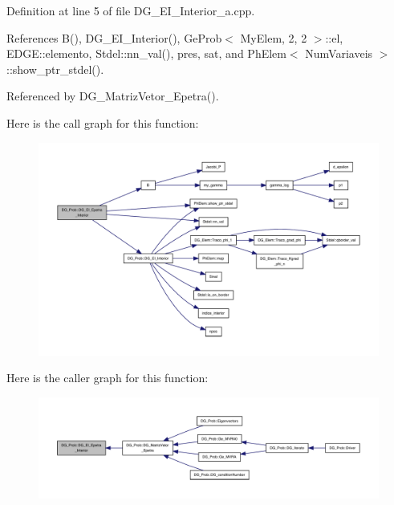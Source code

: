 Definition at line 5 of file D\+G\+\_\+\+E\+I\+\_\+\+Interior\+\_\+a.\+cpp.



References B(), D\+G\+\_\+\+E\+I\+\_\+\+Interior(), Ge\+Prob$<$ My\+Elem, 2, 2 $>$\+::el, E\+D\+G\+E\+::elemento, Stdel\+::nn\+\_\+val(), pres, sat, and Ph\+Elem$<$ Num\+Variaveis $>$\+::show\+\_\+ptr\+\_\+stdel().



Referenced by D\+G\+\_\+\+Matriz\+Vetor\+\_\+\+Epetra().

Here is the call graph for this function\+:
\nopagebreak
\begin{figure}[H]
\begin{center}
\leavevmode
\includegraphics[width=350pt]{classDG__Prob_aa09b19ad56db0010779b0787d0edd2a5_cgraph}
\end{center}
\end{figure}
Here is the caller graph for this function\+:
\nopagebreak
\begin{figure}[H]
\begin{center}
\leavevmode
\includegraphics[width=350pt]{classDG__Prob_aa09b19ad56db0010779b0787d0edd2a5_icgraph}
\end{center}
\end{figure}
\mbox{\label{classDG__Prob_a7fa0c815d5707dbf3858feb3977f5ee5}} 
